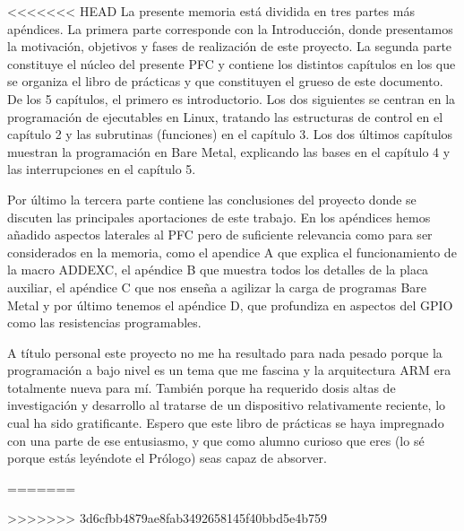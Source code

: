 
<<<<<<< HEAD
La presente memoria está dividida en tres partes más apéndices. La primera
parte corresponde con la Introducción, donde presentamos la motivación, objetivos
y fases de realización de este proyecto. La segunda parte constituye el núcleo
del presente PFC y contiene los distintos capítulos en los que se organiza el
libro de prácticas y que constituyen el grueso de este documento. De los 5
capítulos, el primero es introductorio. Los dos siguientes se centran en la
programación de ejecutables en Linux, tratando las estructuras de control en el
capítulo 2 y las subrutinas (funciones) en el capítulo 3. Los dos últimos
capítulos muestran la programación en Bare Metal, explicando las bases en
el capítulo 4 y las interrupciones en el capítulo 5.

Por último la tercera parte contiene las conclusiones del proyecto donde se
discuten las principales aportaciones de este trabajo. En los apéndices hemos
añadido aspectos laterales al PFC pero de suficiente relevancia como para ser
considerados en la memoria, como el apendice A que explica el funcionamiento
de la macro ADDEXC, el apéndice B que muestra todos los detalles de la placa
auxiliar, el apéndice C que nos enseña a agilizar la carga de programas Bare Metal
y por último tenemos el apéndice D, que profundiza en aspectos del GPIO como
las resistencias programables.

A título personal este proyecto no me ha resultado para nada pesado porque
la programación a bajo nivel es un tema que me fascina y la arquitectura ARM
era totalmente nueva para mí. También porque ha requerido dosis altas de
investigación y desarrollo al tratarse de un dispositivo relativamente
reciente, lo cual ha sido gratificante. Espero que este libro de prácticas se
haya impregnado con una parte de ese entusiasmo, y que como alumno curioso
que eres (lo sé porque estás leyéndote el Prólogo) seas capaz de absorver.

=======
 
>>>>>>> 3d6cfbb4879ae8fab3492658145f40bbd5e4b759
\chapterend
